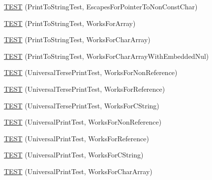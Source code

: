 \begin{DoxyCompactItemize}
\item 
\hyperlink{namespacetesting_1_1gtest__printers__test_a7203081ef422f0835643d2c54b8ebf28}{T\-E\-S\-T} (Print\-To\-String\-Test, Escapes\-For\-Pointer\-To\-Non\-Const\-Char)
\item 
\hyperlink{namespacetesting_1_1gtest__printers__test_a78bd89af8a8505880b78ec2a001d3cb8}{T\-E\-S\-T} (Print\-To\-String\-Test, Works\-For\-Array)
\item 
\hyperlink{namespacetesting_1_1gtest__printers__test_ad122dc21e7ebad023d7048ef117a1129}{T\-E\-S\-T} (Print\-To\-String\-Test, Works\-For\-Char\-Array)
\item 
\hyperlink{namespacetesting_1_1gtest__printers__test_a65e208358dddc7747f4519410c71d877}{T\-E\-S\-T} (Print\-To\-String\-Test, Works\-For\-Char\-Array\-With\-Embedded\-Nul)
\item 
\hyperlink{namespacetesting_1_1gtest__printers__test_ab49ff6527b0b01411b725fe46e1af65c}{T\-E\-S\-T} (Universal\-Terse\-Print\-Test, Works\-For\-Non\-Reference)
\item 
\hyperlink{namespacetesting_1_1gtest__printers__test_ab7adb58a0e08e0830157a5a1c7bceac5}{T\-E\-S\-T} (Universal\-Terse\-Print\-Test, Works\-For\-Reference)
\item 
\hyperlink{namespacetesting_1_1gtest__printers__test_ab11252e228a240a349d747546bc222d2}{T\-E\-S\-T} (Universal\-Terse\-Print\-Test, Works\-For\-C\-String)
\item 
\hyperlink{namespacetesting_1_1gtest__printers__test_a43d4efc91c2ea7d8220891df9b0437df}{T\-E\-S\-T} (Universal\-Print\-Test, Works\-For\-Non\-Reference)
\item 
\hyperlink{namespacetesting_1_1gtest__printers__test_a58ad7c81884e852b09646764ce14a47e}{T\-E\-S\-T} (Universal\-Print\-Test, Works\-For\-Reference)
\item 
\hyperlink{namespacetesting_1_1gtest__printers__test_ac20aca012aca1ca9589dbf7483fbbbd1}{T\-E\-S\-T} (Universal\-Print\-Test, Works\-For\-C\-String)
\item 
\hyperlink{namespacetesting_1_1gtest__printers__test_a23a9eda97679bfc29c87b8de17cc35bf}{T\-E\-S\-T} (Universal\-Print\-Test, Works\-For\-Char\-Array)
\end{DoxyCompactItemize}


